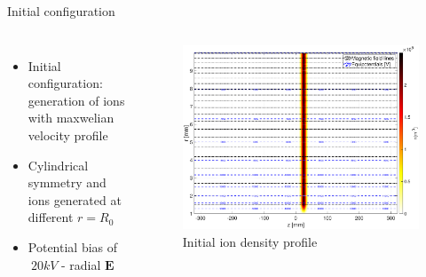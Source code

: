 \documentclass[aspectratio=169,xcolor=dvipsnames,8pt]{beamer}
\begin{document}
\begin{frame}{Initial configuration}
     \begin{columns}[c] %

	\begin{itemize}


		\item{Initial configuration: generation of ions with maxwelian velocity profile}
		\item{Cylindrical symmetry and ions generated at different $r = R_0$}
		\item{Potential bias of $~20kV$ - radial $\mathbf{E}$}
				
						
	\end{itemize}

		\begin{figure}[h!]
		\includegraphics[width=1 \textwidth]{Configuration.eps}
		\caption{\label{config} Initial ion density profile}
		\end{figure}
     \end{columns}
\end{frame}


\end{document}

